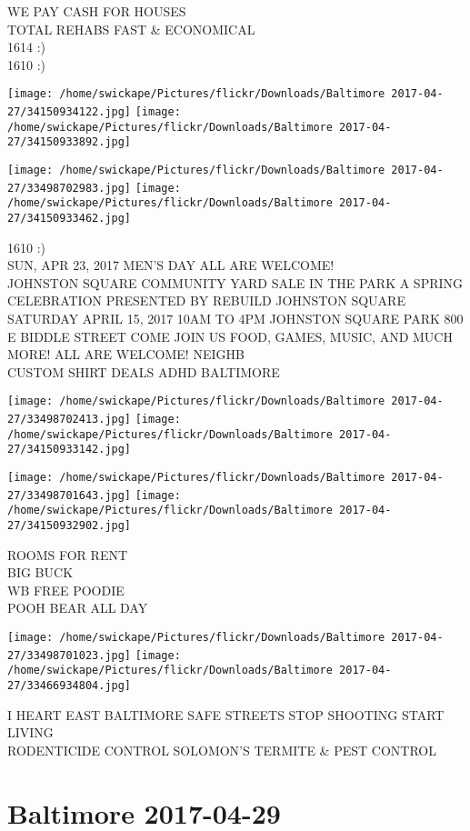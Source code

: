 \documentclass[10pt,letterpaper]{article}
\begin{document}
WE PAY CASH FOR HOUSES\\
TOTAL REHABS FAST \& ECONOMICAL\\
1614 :)\\
1610 :)
\pagebreak

\texttt{[image: /home/swickape/Pictures/flickr/Downloads/Baltimore 2017-04-27/34150934122.jpg]}
\texttt{[image: /home/swickape/Pictures/flickr/Downloads/Baltimore 2017-04-27/34150933892.jpg]}

\texttt{[image: /home/swickape/Pictures/flickr/Downloads/Baltimore 2017-04-27/33498702983.jpg]}
\texttt{[image: /home/swickape/Pictures/flickr/Downloads/Baltimore 2017-04-27/34150933462.jpg]}

1610 :)\\
SUN, APR 23, 2017 MEN'S DAY ALL ARE WELCOME!\\
JOHNSTON SQUARE COMMUNITY YARD SALE IN THE PARK A SPRING CELEBRATION PRESENTED BY REBUILD JOHNSTON SQUARE SATURDAY APRIL 15, 2017 10AM TO 4PM JOHNSTON SQUARE PARK 800 E BIDDLE STREET COME JOIN US FOOD, GAMES, MUSIC, AND MUCH MORE! ALL ARE WELCOME!  NEIGHB\\
CUSTOM SHIRT DEALS ADHD BALTIMORE
\pagebreak

\texttt{[image: /home/swickape/Pictures/flickr/Downloads/Baltimore 2017-04-27/33498702413.jpg]}
\texttt{[image: /home/swickape/Pictures/flickr/Downloads/Baltimore 2017-04-27/34150933142.jpg]}

\texttt{[image: /home/swickape/Pictures/flickr/Downloads/Baltimore 2017-04-27/33498701643.jpg]}
\texttt{[image: /home/swickape/Pictures/flickr/Downloads/Baltimore 2017-04-27/34150932902.jpg]}

ROOMS FOR RENT\\
BIG BUCK\\
WB FREE POODIE\\
POOH BEAR ALL DAY
\pagebreak

\texttt{[image: /home/swickape/Pictures/flickr/Downloads/Baltimore 2017-04-27/33498701023.jpg]}
\texttt{[image: /home/swickape/Pictures/flickr/Downloads/Baltimore 2017-04-27/33466934804.jpg]}

I HEART EAST BALTIMORE SAFE STREETS STOP SHOOTING START LIVING\\
RODENTICIDE CONTROL SOLOMON'S TERMITE \& PEST CONTROL
\pagebreak

\section*{Baltimore 2017-04-29}
\end{document}
